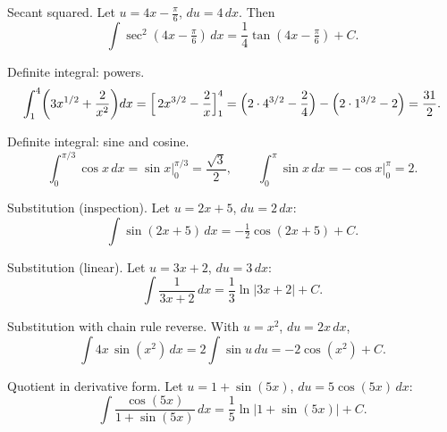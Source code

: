 \documentclass[11pt]{article}
\def\textbf#1{#1}%
\begin{document}
\begin{solution}
\textbf{Secant squared.}
Let $u=4x-\tfrac{\pi}{6}$, $du=4\,dx$. Then
\[
\int \sec^{2}(4x-\tfrac{\pi}{6})\,dx
=\frac{1}{4}\tan(4x-\tfrac{\pi}{6})+C .
\]
\end{solution}

\begin{solution}
\textbf{Definite integral: powers.}
\[
\int_{1}^{4}\!\left(3x^{1/2}+\frac{2}{x^{2}}\right)\!dx
=\Bigl[\,2x^{3/2}-\frac{2}{x}\Bigr]_{1}^{4}
=\Bigl(2\cdot 4^{3/2}-\frac{2}{4}\Bigr)-\Bigl(2\cdot 1^{3/2}-2\Bigr)
=\frac{31}{2}.
\]
\end{solution}

\begin{solution}
\textbf{Definite integral: sine and cosine.}
\[
\int_{0}^{\pi/3}\!\cos x\,dx=\sin x\Big|_{0}^{\pi/3}=\frac{\sqrt3}{2},
\qquad
\int_{0}^{\pi}\!\sin x\,dx=-\cos x\Big|_{0}^{\pi}=2 .
\]
\end{solution}

\begin{solution}
\textbf{Substitution (inspection).}
Let $u=2x+5$, $du=2\,dx$:
\[
\int \sin(2x+5)\,dx=-\tfrac12\cos(2x+5)+C .
\]
\end{solution}

\begin{solution}
\textbf{Substitution (linear).}
Let $u=3x+2$, $du=3\,dx$:
\[
\int \frac{1}{3x+2}\,dx=\frac{1}{3}\ln|3x+2|+C .
\]
\end{solution}

\begin{solution}
\textbf{Substitution with chain rule reverse.}
With $u=x^{2}$, $du=2x\,dx$,
\[
\int 4x\,\sin(x^{2})\,dx=2\int \sin u\,du=-2\cos(x^{2})+C .
\]
\end{solution}

\begin{solution}
\textbf{Quotient in derivative form.}
Let $u=1+\sin(5x)$, $du=5\cos(5x)\,dx$:
\[
\int \frac{\cos(5x)}{1+\sin(5x)}\,dx=\frac{1}{5}\ln|1+\sin(5x)|+C .
\]
\end{solution}
\end{document}
